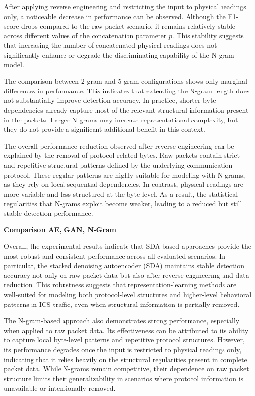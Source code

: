 After applying reverse engineering and restricting the input to physical readings only, a noticeable decrease in performance can be observed. Although the F1-score drops compared to the raw packet scenario, it remains relatively stable across different values of the concatenation parameter 
$p$. This stability suggests that increasing the number of concatenated physical readings does not significantly enhance or degrade the discriminating capability of the N-gram model.

The comparison between 2-gram and 5-gram configurations shows only marginal differences in performance. This indicates that extending the N-gram length does not substantially improve detection accuracy. In practice, shorter byte dependencies already capture most of the relevant structural information present in the packets. Larger N-grams may increase representational complexity, but they do not provide a significant additional benefit in this context.

The overall performance reduction observed after reverse engineering can be explained by the removal of protocol-related bytes. Raw packets contain strict and repetitive structural patterns defined by the underlying communication protocol. These regular patterns are highly suitable for modeling with N-grams, as they rely on local sequential dependencies. In contrast, physical readings are more variable and less structured at the byte level. As a result, the statistical regularities that N-grams exploit become weaker, leading to a reduced but still stable detection performance.


\textbf{Comparison AE, GAN, N-Gram}

Overall, the experimental results indicate that \ac{SDA}-based approaches provide the most robust and consistent performance across all evaluated scenarios. In particular, the stacked denoising autoencoder (SDA) maintains stable detection accuracy not only on raw packet data but also after reverse engineering and data reduction. This robustness suggests that representation-learning methods are well-suited for modeling both protocol-level structures and higher-level behavioral patterns in ICS traffic, even when structural information is partially removed.

The N-gram-based approach also demonstrates strong performance, especially when applied to raw packet data. Its effectiveness can be attributed to its ability to capture local byte-level patterns and repetitive protocol structures. However, its performance degrades once the input is restricted to physical readings only, indicating that it relies heavily on the structural regularities present in complete packet data. While N-grams remain competitive, their dependence on raw packet structure limits their generalizability in scenarios where protocol information is unavailable or intentionally removed.


